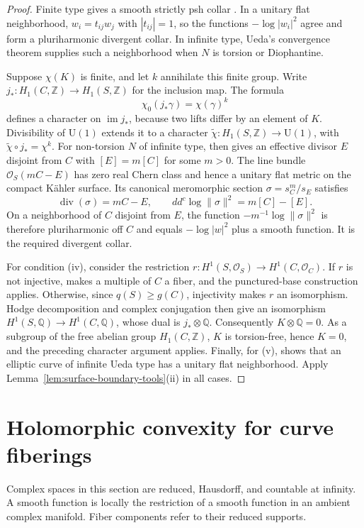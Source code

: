 \documentclass[11pt]{amsart}
\theoremstyle{definition}
\theoremstyle{remark}
\numberwithin{equation}{section}
\newcommand{\OO}{\mathcal O}
\newcommand{\ddc}{dd^c}
\newcommand{\Uone}{\mathrm U(1)}
\begin{document}
\begin{proof}
Finite type gives a smooth strictly psh collar
\cite[Theorem~2.5]{CLPT2018}. In a unitary flat neighborhood,
$w_i=t_{ij}w_j$ with $|t_{ij}|=1$, so the functions
$-\log|w_i|^2$ agree and form a pluriharmonic divergent collar.
In infinite type, Ueda's convergence theorem
\cite[Theorem~3]{Ueda1983} supplies such a neighborhood when $N$
is torsion or Diophantine.

Suppose $\chi(K)$ is finite, and let $k$ annihilate this finite
group. Write $j_*:H_1(C,\mathbb Z)\to H_1(S,\mathbb Z)$ for
the inclusion map. The formula
\[
 \chi_0(j_*\gamma)=\chi(\gamma)^k
\]
defines a character on $\operatorname{im}j_*$, because two lifts
differ by an element of $K$. Divisibility of $\Uone$ extends it
to a character $\widetilde\chi:H_1(S,\mathbb Z)\to\Uone$, with
$\widetilde\chi\circ j_*=\chi^k$. For non-torsion $N$ of infinite
type, \cite[Theorem~4.4]{CLPT2018} then gives an effective divisor
$E$ disjoint from $C$ with $[E]=m[C]$ for some $m>0$.
The line bundle $\OO_S(mC-E)$ has zero real Chern class and hence
a unitary flat metric on the compact K\"ahler surface. Its canonical
meromorphic section $\sigma=s_C^m/s_E$ satisfies
\[
 \operatorname{div}(\sigma)=mC-E,\qquad
 \ddc\log\|\sigma\|^2=m[C]-[E].
\]
On a neighborhood of $C$ disjoint from $E$, the function
$-m^{-1}\log\|\sigma\|^2$ is therefore pluriharmonic off $C$ and
equals $-\log|w|^2$ plus a smooth function. It is the required
divergent collar.

For condition \textup{(iv)}, consider the restriction
$r:H^1(S,\OO_S)\to H^1(C,\OO_C)$. If $r$ is not injective,
\cite[Proposition~2.7]{CLPT2018} makes a multiple of $C$ a fiber,
and the punctured-base construction applies. Otherwise, since
$q(S)\ge g(C)$, injectivity makes $r$ an isomorphism.
Hodge decomposition and complex
conjugation then give an isomorphism
$H^1(S,\mathbb Q)\to H^1(C,\mathbb Q)$, whose dual is
$j_*\otimes\mathbb Q$. Consequently $K\otimes\mathbb Q=0$.
As a subgroup of the free abelian group $H_1(C,\mathbb Z)$, $K$
is torsion-free, hence $K=0$, and the preceding character argument
applies.
Finally, for \textup{(v)}, \cite[Theorem~1.6]{CFSTZ2026} shows that
an elliptic curve of infinite Ueda type has a unitary flat neighborhood.
Apply
Lemma~\ref{lem:surface-boundary-tools}\textup{(ii)} in all cases.
\end{proof}

\section{Holomorphic convexity for curve fiberings}\label{sec:curve-fibers}
Complex spaces in this section are reduced, Hausdorff, and countable at
infinity. A smooth function is locally the restriction of a smooth
function in an ambient complex manifold. Fiber components refer to
their reduced supports.
\end{document}
